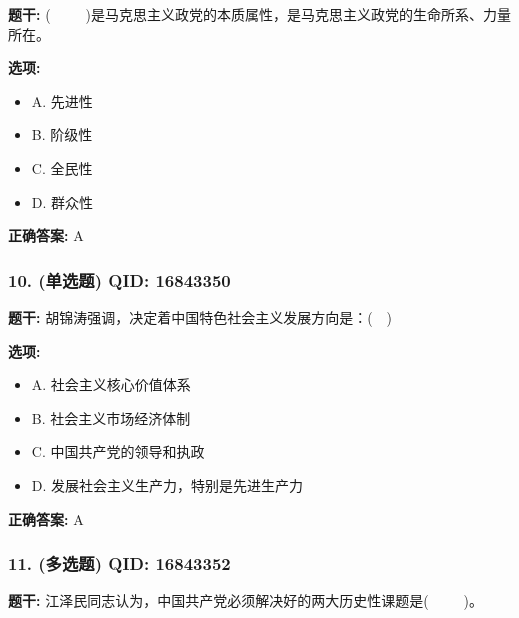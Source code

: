 \documentclass[12pt,UTF8]{ctexart}
\begin{document}
\textbf{题干:}
(     )是马克思主义政党的本质属性，是马克思主义政党的生命所系、力量所在。

\textbf{选项:}
\begin{itemize}[leftmargin=*]

  \item A. 先进性

  \item B. 阶级性

  \item C. 全民性

  \item D. 群众性

\end{itemize}

\textbf{正确答案:}
A

\vspace{0.3em}\hrulefill\vspace{0.7em}

\subsubsection*{10. (单选题) \small QID: 16843350}

\textbf{题干:}
胡锦涛强调，决定着中国特色社会主义发展方向是：(  )

\textbf{选项:}
\begin{itemize}[leftmargin=*]

  \item A. 社会主义核心价值体系

  \item B. 社会主义市场经济体制

  \item C. 中国共产党的领导和执政

  \item D. 发展社会主义生产力，特别是先进生产力

\end{itemize}

\textbf{正确答案:}
A

\vspace{0.3em}\hrulefill\vspace{0.7em}

\subsubsection*{11. (多选题) \small QID: 16843352}

\textbf{题干:}
江泽民同志认为，中国共产党必须解决好的两大历史性课题是(     )。
\end{document}
